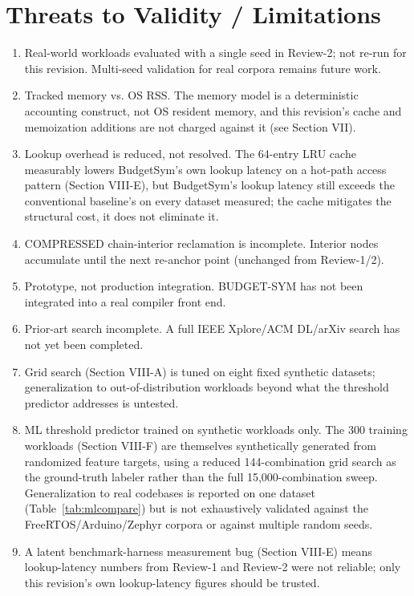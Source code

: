 \documentclass[conference]{IEEEtran}
\begin{document}
\section{Threats to Validity / Limitations}
\begin{enumerate}
\item Real-world workloads evaluated with a single seed in Review-2; not
  re-run for this revision. Multi-seed validation for real corpora remains
  future work.
\item Tracked memory vs. OS RSS. The memory model is a deterministic
  accounting construct, not OS resident memory, and this revision's cache
  and memoization additions are not charged against it (see Section VII).
\item Lookup overhead is reduced, not resolved. The 64-entry LRU cache
  measurably lowers BudgetSym's own lookup latency on a hot-path access
  pattern (Section VIII-E), but BudgetSym's lookup latency still exceeds the
  conventional baseline's on every dataset measured; the cache mitigates the
  structural cost, it does not eliminate it.
\item COMPRESSED chain-interior reclamation is incomplete. Interior nodes
  accumulate until the next re-anchor point (unchanged from Review-1/2).
\item Prototype, not production integration. BUDGET-SYM has not been
  integrated into a real compiler front end.
\item Prior-art search incomplete. A full IEEE Xplore/ACM DL/arXiv search
  has not yet been completed.
\item Grid search (Section VIII-A) is tuned on eight fixed synthetic
  datasets; generalization to out-of-distribution workloads beyond what the
  threshold predictor addresses is untested.
\item ML threshold predictor trained on synthetic workloads only. The 300
  training workloads (Section VIII-F) are themselves synthetically generated
  from randomized feature targets, using a reduced 144-combination grid
  search as the ground-truth labeler rather than the full 15,000-combination
  sweep. Generalization to real codebases is reported on one dataset
  (Table~\ref{tab:mlcompare}) but is not exhaustively validated against the
  FreeRTOS/Arduino/Zephyr corpora or against multiple random seeds.
\item A latent benchmark-harness measurement bug (Section VIII-E) means
  lookup-latency numbers from Review-1 and Review-2 were not reliable; only
  this revision's own lookup-latency figures should be trusted.

\end{enumerate}
\end{document}
